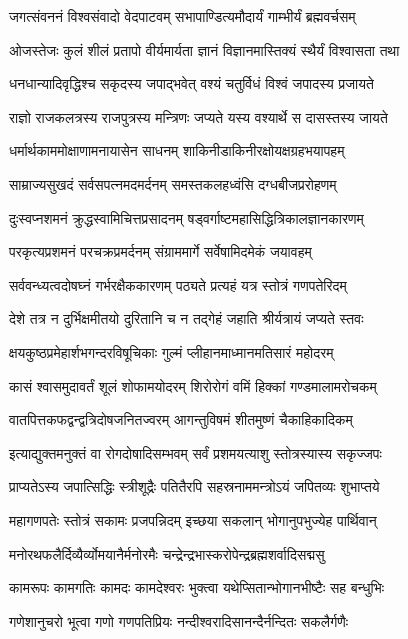 \twolineshloka
{जगत्संवननं विश्वसंवादो वेदपाटवम्}
{सभापाण्डित्यमौदार्यं गाम्भीर्यं ब्रह्मवर्चसम्}

\twolineshloka
{ओजस्तेजः कुलं शीलं प्रतापो वीर्यमार्यता}
{ज्ञानं विज्ञानमास्तिक्यं स्थैर्यं विश्वासता तथा}

\twolineshloka
{धनधान्यादिवृद्धिश्च सकृदस्य जपाद्भवेत्}
{वश्यं चतुर्विधं विश्वं जपादस्य प्रजायते}

\twolineshloka
{राज्ञो राजकलत्रस्य राजपुत्रस्य मन्त्रिणः}
{जप्यते यस्य वश्यार्थे स दासस्तस्य जायते}

\twolineshloka
{धर्मार्थकाममोक्षाणामनायासेन साधनम्}
{शाकिनीडाकिनीरक्षोयक्षग्रहभयापहम्}

\twolineshloka
{साम्राज्यसुखदं सर्वसपत्नमदमर्दनम्}
{समस्तकलहध्वंसि दग्धबीजप्ररोहणम्}

\twolineshloka
{दुःस्वप्नशमनं क्रुद्धस्वामिचित्तप्रसादनम्}
{षड्वर्गाष्टमहासिद्धित्रिकालज्ञानकारणम्}

\twolineshloka
{परकृत्यप्रशमनं परचक्रप्रमर्दनम्}
{संग्राममार्गे सर्वेषामिदमेकं जयावहम्}

\twolineshloka
{सर्ववन्ध्यत्वदोषघ्नं गर्भरक्षैककारणम्}
{पठ्यते प्रत्यहं यत्र स्तोत्रं गणपतेरिदम्}

\twolineshloka
{देशे तत्र न दुर्भिक्षमीतयो दुरितानि च}
{न तद्गेहं जहाति श्रीर्यत्रायं जप्यते स्तवः}

\twolineshloka
{क्षयकुष्ठप्रमेहार्शभगन्दरविषूचिकाः}
{गुल्मं प्लीहानमाध्मानमतिसारं महोदरम्}

\twolineshloka
{कासं श्वासमुदावर्तं शूलं शोफामयोदरम्}
{शिरोरोगं वमिं हिक्कां गण्डमालामरोचकम्}

\twolineshloka
{वातपित्तकफद्वन्द्वत्रिदोषजनितज्वरम्}
{आगन्तुविषमं शीतमुष्णं चैकाहिकादिकम्}

\twolineshloka
{इत्याद्युक्तमनुक्तं वा रोगदोषादिसम्भवम्}
{सर्वं प्रशमयत्याशु स्तोत्रस्यास्य सकृज्जपः}

\twolineshloka
{प्राप्यतेऽस्य जपात्सिद्धिः स्त्रीशूद्रैः पतितैरपि}
{सहस्रनाममन्त्रोऽयं जपितव्यः शुभाप्तये}

\twolineshloka
{महागणपतेः स्तोत्रं सकामः प्रजपन्निदम्}
{इच्छया सकलान् भोगानुपभुज्येह पार्थिवान्}

\twolineshloka
{मनोरथफलैर्दिव्यैर्व्योमयानैर्मनोरमैः}
{चन्द्रेन्द्रभास्करोपेन्द्रब्रह्मशर्वादिसद्मसु}

\twolineshloka
{कामरूपः कामगतिः कामदः कामदेश्वरः}
{भुक्त्वा यथेप्सितान्भोगानभीष्टैः सह बन्धुभिः}

\twolineshloka
{गणेशानुचरो भूत्वा गणो गणपतिप्रियः}
{नन्दीश्वरादिसानन्दैर्नन्दितः सकलैर्गणैः}

